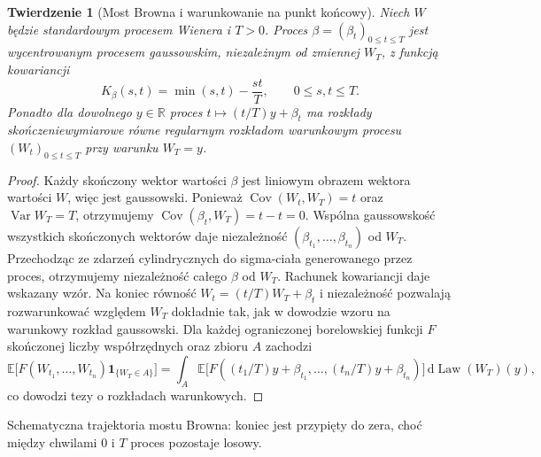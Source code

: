 \documentclass[11pt,a4paper,oneside]{report}
\numberwithin{equation}{chapter}
\theoremstyle{plain}
\newtheorem{twierdzenie}{Twierdzenie}[chapter]
\theoremstyle{definition}
\theoremstyle{remark}
\newcommand{\R}{\mathbb{R}}
\newcommand{\E}{\mathbb{E}}
\newcommand{\Var}{\operatorname{Var}}
\newcommand{\Cov}{\operatorname{Cov}}
\newcommand{\Law}{\operatorname{Law}}
\newcommand{\ind}[1]{\mathbf{1}_{#1}}
\newcommand{\dd}{\mathrm{d}}
\begin{document}
\begin{twierdzenie}[Most Browna i warunkowanie na punkt końcowy]
Niech $W$ będzie standardowym procesem Wienera i $T>0$.
Proces $\beta=(\beta_t)_{0\le t\le T}$ jest wycentrowanym
procesem gaussowskim, niezależnym od zmiennej $W_T$,
z funkcją kowariancji
\[
K_\beta(s,t)=\min(s,t)-\frac{st}{T},
\qquad 0\le s,t\le T.
\]
Ponadto dla dowolnego $y\in\R$ proces
$t\mapsto (t/T)y+\beta_t$ ma rozkłady skończeniewymiarowe
równe regularnym rozkładom warunkowym procesu
$(W_t)_{0\le t\le T}$ przy warunku $W_T=y$.
\end{twierdzenie}
\begin{proof}
Każdy skończony wektor wartości $\beta$ jest liniowym obrazem
wektora wartości $W$, więc jest gaussowski.
Ponieważ $\Cov(W_t,W_T)=t$ oraz $\Var W_T=T$,
otrzymujemy $\Cov(\beta_t,W_T)=t-t=0$.
Wspólna gaussowskość wszystkich skończonych wektorów daje
niezależność $(\beta_{t_1},\ldots,\beta_{t_n})$ od $W_T$.
Przechodząc ze zdarzeń cylindrycznych do sigma-ciała generowanego
przez proces, otrzymujemy niezależność całego $\beta$ od $W_T$.
Rachunek kowariancji daje wskazany wzór.
Na koniec równość $W_t=(t/T)W_T+\beta_t$ i niezależność
pozwalają rozwarunkować względem $W_T$ dokładnie tak,
jak w dowodzie wzoru na warunkowy rozkład gaussowski.
Dla każdej ograniczonej borelowskiej funkcji $F$ skończonej
liczby współrzędnych oraz zbioru $A$ zachodzi
\[
\E\bigl[F(W_{t_1},\ldots,W_{t_n})\ind{\{W_T\in A\}}\bigr]
=\int_A \E\bigl[F((t_1/T)y+\beta_{t_1},\ldots,
(t_n/T)y+\beta_{t_n})\bigr]\,\dd\Law(W_T)(y),
\]
co dowodzi tezy o rozkładach warunkowych.
\end{proof}

\begin{center}
\par\smallskip\small Schematyczna trajektoria mostu Browna: koniec jest przypięty do zera,
choć między chwilami $0$ i $T$ proces pozostaje losowy.
\end{center}
\end{document}
